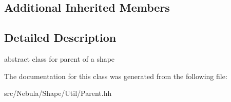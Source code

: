 \subsection*{Additional Inherited Members}


\subsection{Detailed Description}
abstract class for parent of a shape 

The documentation for this class was generated from the following file\-:\begin{DoxyCompactItemize}
\item 
src/\-Nebula/\-Shape/\-Util/Parent.\-hh\end{DoxyCompactItemize}
